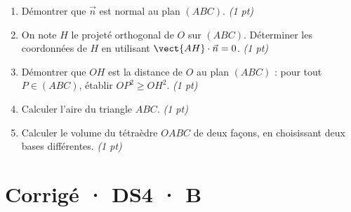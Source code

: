 \begin{enumerate}

\item Démontrer que $\vec n$ est normal au plan $(ABC)$. \hfill\textit{(1 pt)}

\item On note $H$ le projeté orthogonal de $O$ sur $(ABC)$. Déterminer les coordonnées de $H$ en utilisant $\vect{AH}\cdot\vec n=0$. \hfill\textit{(1 pt)}

\item Démontrer que $OH$ est la distance de $O$ au plan $(ABC)$ : pour tout $P\in(ABC)$, établir $OP^2\ge OH^2$. \hfill\textit{(1 pt)}

\item Calculer l'aire du triangle $ABC$. \hfill\textit{(1 pt)}

\item Calculer le volume du tétraèdre $OABC$ de deux façons, en choisissant deux bases différentes. \hfill\textit{(1 pt)}

\end{enumerate}

\ifprof\clearpage

\section*{Corrigé · DS4 · B}\label{cor:6-4}

